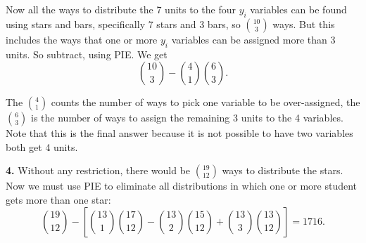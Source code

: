 \documentclass[10pt,]{book}
\theoremstyle{plain}
\theoremstyle{definition}
\theoremstyle{definition}
\theoremstyle{definition}
\numberwithin{equation}{section}
\begin{document}
            Now all the ways to distribute the 7 units to the four \(y_i\) variables can be found using stars and bars, specifically 7 stars and 3 bars,
            so \({10 \choose 3}\) ways. But this includes the ways that one or more \(y_i\) variables can be assigned more than 3 units. So subtract, using PIE. We get
            \begin{equation*}
              {10 \choose 3} - {4\choose 1} {6 \choose 3}.
            \end{equation*}
\par

            The \({4 \choose 1}\) counts the number of ways to pick one variable to be over-assigned, the \({6 \choose 3}\) is the number of ways to assign the remaining 3 units to the 4 variables.  Note that this is the final answer because it is not possible to have two variables both get 4 units.
\par\smallskip
\noindent\textbf{4.}\quad{}
            Without any restriction, there would be \({19\choose 12}\) ways to distribute the stars. Now we must use PIE to eliminate all distributions in which one or more student gets more than one star:
            \begin{equation*}
              {19 \choose 12} - \left[{13 \choose 1}{17 \choose 12} - {13\choose 2}{15 \choose 12} + {13\choose 3}{13 \choose 12}\right] = 1716.
            \end{equation*}
\par
\end{document}
